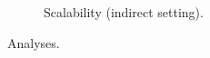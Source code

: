 \begin{figure}[t]
\begin{subfigure}[t]{0.49 \textwidth}
%
\caption{\textmd{Scalability (indirect setting).}}
\label{fig:power-total}
\end{subfigure}
%
%
%
\caption{\textmd{Analyses.}}
%
\label{fig:analysis}
\end{figure}
